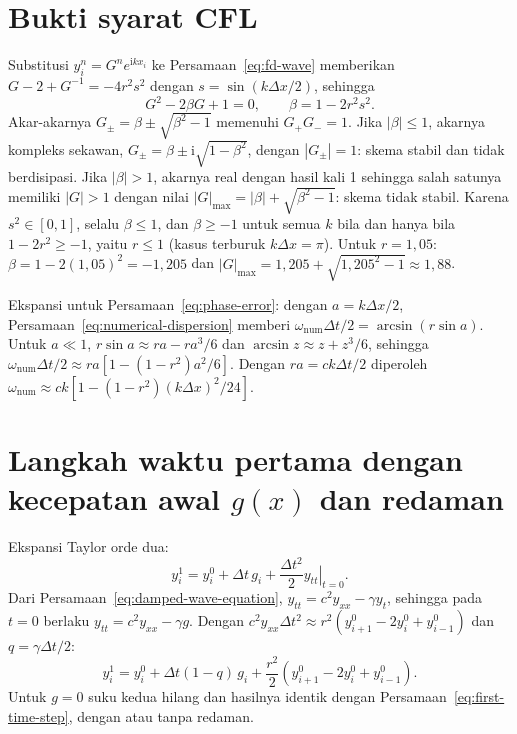 \documentclass[aps,prl,twocolumn,superscriptaddress]{revtex4-2}
\renewcommand{\thesection}{\Roman{section}}
\begin{document}


\appendix
\renewcommand{\thesection}{\Alph{section}}

\section{Bukti syarat CFL}
\label{app:cfl}

Substitusi $y_i^n=G^ne^{\mathrm{i}kx_i}$ ke Persamaan~\eqref{eq:fd-wave} memberikan $G-2+G^{-1}=-4r^2s^2$ dengan $s=\sin(k\Delta x/2)$, sehingga
\begin{equation}
    G^2-2\beta G+1=0,\qquad \beta=1-2r^2s^2.
\end{equation}
Akar-akarnya $G_\pm=\beta\pm\sqrt{\beta^2-1}$ memenuhi $G_+G_-=1$. 
Jika $|\beta|\leq1$, akarnya kompleks sekawan, $G_\pm=\beta\pm\mathrm{i}\sqrt{1-\beta^2}$, dengan $|G_\pm|=1$: skema stabil dan tidak berdisipasi. 
Jika $|\beta|>1$, akarnya real dengan hasil kali 1 sehingga salah satunya memiliki $|G|>1$ dengan nilai $|G|_{\max}=|\beta|+\sqrt{\beta^2-1}$: skema tidak stabil. 
Karena $s^2\in[0,1]$, selalu $\beta\leq1$, dan $\beta\geq-1$ untuk semua $k$ bila dan hanya bila $1-2r^2\geq-1$, yaitu $r\leq1$ (kasus terburuk $k\Delta x=\pi$). 
Untuk $r=1{,}05$: $\beta=1-2(1{,}05)^2=-1{,}205$ dan $|G|_{\max}=1{,}205+\sqrt{1{,}205^2-1}\approx1{,}88$.

Ekspansi untuk Persamaan~\eqref{eq:phase-error}: dengan $a=k\Delta x/2$, Persamaan~\eqref{eq:numerical-dispersion} memberi $\omega_{\mathrm{num}}\Delta t/2=\arcsin(r\sin a)$. 
Untuk $a\ll1$, $r\sin a\approx ra-ra^3/6$ dan $\arcsin z\approx z+z^3/6$, sehingga $\omega_{\mathrm{num}}\Delta t/2\approx ra\left[1-(1-r^2)a^2/6\right]$. 
Dengan $ra=ck\Delta t/2$ diperoleh $\omega_{\mathrm{num}}\approx ck\left[1-(1-r^2)(k\Delta x)^2/24\right]$.

\section{Langkah waktu pertama dengan kecepatan awal $g(x)$ dan redaman}
\label{app:first-step}

Ekspansi Taylor orde dua:
\begin{equation}
    y_i^1=y_i^0+\Delta t\,g_i+\frac{\Delta t^2}{2}\left.y_{tt}\right|_{t=0}.
\end{equation}
Dari Persamaan~\eqref{eq:damped-wave-equation}, $y_{tt}=c^2y_{xx}-\gamma y_t$, sehingga pada $t=0$ berlaku $y_{tt}=c^2y_{xx}-\gamma g$. 
Dengan $c^2y_{xx}\Delta t^2\approx r^2\left(y_{i+1}^0-2y_i^0+y_{i-1}^0\right)$ dan $q=\gamma\Delta t/2$:
\begin{equation}
    y_i^1=y_i^0+\Delta t(1-q)\,g_i+\frac{r^2}{2}\left(y_{i+1}^0-2y_i^0+y_{i-1}^0\right).
\end{equation}
Untuk $g=0$ suku kedua hilang dan hasilnya identik dengan Persamaan~\eqref{eq:first-time-step}, dengan atau tanpa redaman.
\end{document}
